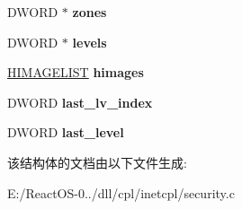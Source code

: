 \begin{DoxyCompactItemize}
\item 
\mbox{\label{structsecdlg__data__s_a321e0b5c369bf2999ea88144b90f4dd4}} 
D\+W\+O\+RD $\ast$ {\bfseries zones}
\item 
\mbox{\label{structsecdlg__data__s_ad67cf50e68d75cea76a3158f53a7cec1}} 
D\+W\+O\+RD $\ast$ {\bfseries levels}
\item 
\mbox{\label{structsecdlg__data__s_aea15aaa39031c6b9e3f113e43a829914}} 
\hyperlink{struct___i_m_a_g_e_l_i_s_t}{H\+I\+M\+A\+G\+E\+L\+I\+ST} {\bfseries himages}
\item 
\mbox{\label{structsecdlg__data__s_a25814c480bf84ccd644cf256e439c516}} 
D\+W\+O\+RD {\bfseries last\+\_\+lv\+\_\+index}
\item 
\mbox{\label{structsecdlg__data__s_a99e4cf0fd2a65cedb183af1e8845ff65}} 
D\+W\+O\+RD {\bfseries last\+\_\+level}
\end{DoxyCompactItemize}


该结构体的文档由以下文件生成\+:\begin{DoxyCompactItemize}
\item 
E\+:/\+React\+O\+S-\/0../dll/cpl/inetcpl/security.\+c\end{DoxyCompactItemize}
